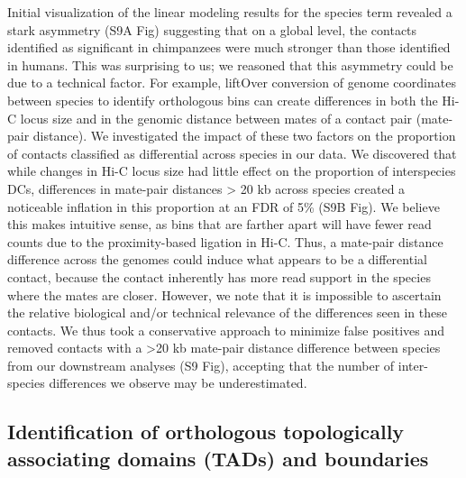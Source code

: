 Initial visualization of the linear modeling results for the species term revealed a stark asymmetry (S9A Fig) suggesting that on a global level, the contacts identified as significant in chimpanzees were much stronger than those identified in humans. This was surprising to us; we reasoned that this asymmetry could be due to a technical factor. For example, liftOver conversion of genome coordinates between species to identify orthologous bins can create differences in both the Hi-C locus size and in the genomic distance between mates of a contact pair (mate-pair distance). We investigated the impact of these two factors on the proportion of contacts classified as differential across species in our data. We discovered that while changes in Hi-C locus size had little effect on the proportion of interspecies DCs, differences in mate-pair distances {\textgreater} 20 kb across species created a noticeable inflation in this proportion at an FDR of 5\% (S9B Fig). We believe this makes intuitive sense, as bins that are farther apart will have fewer read counts due to the proximity-based ligation in Hi-C. Thus, a mate-pair distance difference across the genomes could induce what appears to be a differential contact, because the contact inherently has more read support in the species where the mates are closer. However, we note that it is impossible to ascertain the relative biological and/or technical relevance of the differences seen in these contacts. We thus took a conservative approach to minimize false positives and removed contacts with a {\textgreater}20 kb mate-pair distance difference between species from our downstream analyses (S9 Fig), accepting that the number of inter-species differences we observe may be underestimated.

\subsection{Identification of orthologous topologically associating domains (TADs) and boundaries}

